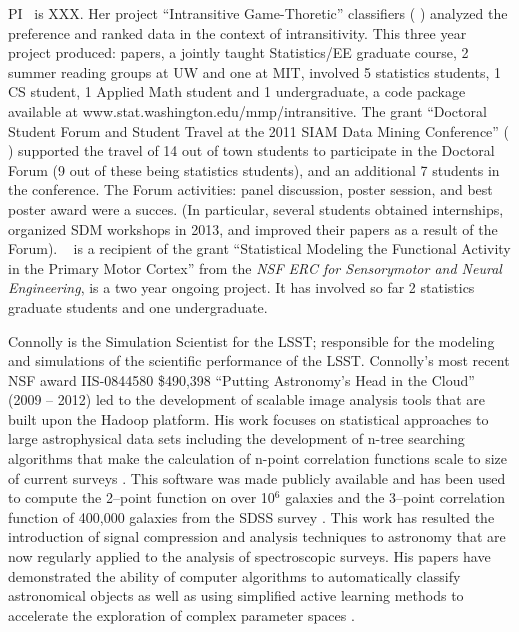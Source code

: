 PI \meila\ is XXX. Her project ``Intransitive Game-Thoretic''
classifiers ( ) analyzed the preference and ranked data in the context
of intransitivity. This three year project produced: 
papers, a jointly taught Statistics/EE graduate course, 2 summer
reading groups at UW and one at MIT, involved 5 statistics students, 1
CS student, 1 Applied Math student and 1 undergraduate, a code package
available at {www.stat.washington.edu/mmp/intransitive}. The grant
``Doctoral Student Forum and Student Travel at the 2011 SIAM Data
Mining Conference'' ( ) supported the travel of 14 out of town
students to participate in the Doctoral Forum (9 out of these being
statistics students), and an additional 7 students in the
conference. The Forum activities: panel discussion, poster session,
and best poster award were a succes. (In particular, several students
obtained internships, organized SDM workshops in 2013, and improved
their papers as a result of the Forum). \meila~ is a recipient of the
grant ``Statistical Modeling the Functional Activity in the Primary
Motor Cortex'' from the {\em NSF ERC for Sensorymotor and Neural
  Engineering}, is a two year ongoing project. It has involved so far
2 statistics graduate students and one undergraduate.


Connolly is the Simulation Scientist for the LSST; responsible for the
modeling and simulations of the scientific performance of the
LSST. Connolly's most recent NSF award IIS-0844580 \$490,398 ``Putting
Astronomy's Head in the Cloud'' (2009 -- 2012) led to the development
of scalable image analysis tools that are built upon the Hadoop
platform\citep{wiley2011}. His work focuses on statistical approaches
to large astrophysical data sets including the development of n-tree
searching algorithms that make the calculation of n-point correlation
functions scale to size of current surveys \cite{Moore00}. This
software was made publicly available and has been used to compute the
2--point function on over 10$^6$ galaxies and the 3--point correlation
function of 400,000 galaxies from the SDSS survey
\cite{Scranton2002,Szapudi2002,Nichol2006,mcbride2011a,mcbride2011b}. This
work has resulted the introduction of signal compression and analysis
techniques to astronomy that are now regularly applied to the analysis
of spectroscopic surveys. His papers have demonstrated the ability of
computer algorithms to automatically classify astronomical objects
\cite{vdp2009,daniel2011} as well as using simplified active learning
methods to accelerate the exploration of complex parameter spaces
\cite{daniel2012}.

